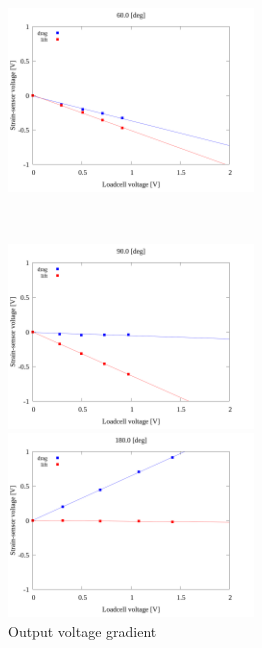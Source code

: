 \begin{figure}[htbp]
\begin{minipage}[b]{0.45\linewidth}
      \end{minipage}
      \begin{minipage}[b]{0.45\linewidth}
        \centering
        \includegraphics[width=65mm]{../../02_workspace/result/2-1/plot/04/04_linear_600.png}
      \end{minipage} \\
      \begin{minipage}[b]{0.45\linewidth}
        \centering
        \includegraphics[width=65mm]{../../02_workspace/result/2-1/plot/04/04_linear_900.png}
      \end{minipage}
      \begin{minipage}[b]{0.45\linewidth}
        \centering
        \includegraphics[width=65mm]{../../02_workspace/result/2-1/plot/04/04_linear_1800.png}
      \end{minipage}
      \caption{Output voltage gradient}
    \end{figure}

